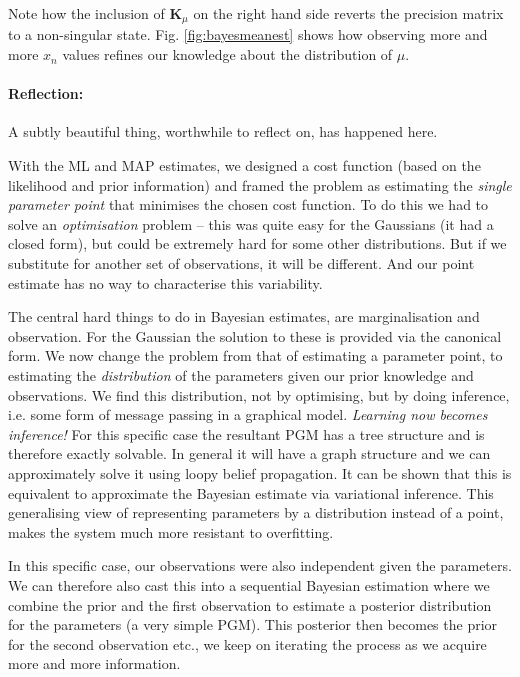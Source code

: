 Note how the inclusion of $\bm{K}_{\mu}$ on the right hand side
reverts the precision matrix to a non-singular
state. Fig. \ref{fig:bayesmeanest} shows how observing more and more
$x_{n}$ values refines our knowledge about the distribution of $\mu$.

\paragraph{Reflection:}

A subtly beautiful thing, worthwhile to reflect on, has happened here.

With the ML and MAP estimates, we designed a cost function (based
on the likelihood and prior information) and framed the problem as
estimating the \emph{single parameter point} that minimises the chosen
cost function. To do this we had to solve an \emph{optimisation} problem
-- this was quite easy for the Gaussians (it had a closed form), but
could be extremely hard for some other distributions. But if we substitute
for another set of observations, it will be different. And our point
estimate has no way to characterise this variability.

The central hard things to do in Bayesian estimates, are marginalisation
and observation. For the Gaussian the solution to these is provided
via the canonical form. We now change the problem from that of estimating
a parameter point, to estimating the \emph{distribution} of the parameters
given our prior knowledge and observations. We find this distribution,
not by optimising, but by doing inference, i.e. some form of message
passing in a graphical model. \emph{Learning now becomes inference!}
For this specific case the resultant PGM has a tree structure and
is therefore exactly solvable. In general it will have a graph structure
and we can approximately solve it using loopy belief propagation.
It can be shown \cite{Barber2012} that this is equivalent to approximate
the Bayesian estimate via variational inference\cite{MacKay2003}.
This generalising view of representing parameters by a distribution
instead of a point, makes the system much more resistant to overfitting.

In this specific case, our observations were also independent given
the parameters. We can therefore also cast this into a sequential
Bayesian estimation where we combine the prior and the first observation
to estimate a posterior distribution for the parameters (a very simple
PGM). This posterior then becomes the prior for the second observation
etc., we keep on iterating the process as we acquire more and more
information.


